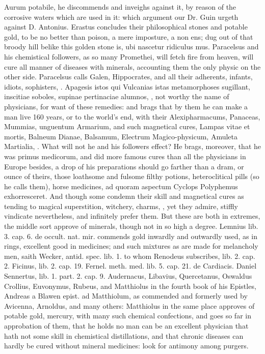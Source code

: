 {Aurum potabile, he discommends and inveighs against it, by reason
of the corrosive waters which are used in it: which argument our Dr.
Guin urgeth against D. Antonius. Erastus concludes their
philosophical stones and potable gold, \etc{} to be no better than poison,
a mere imposture, a non ens; dug out of that broody hill belike this
golden stone is, ubi nascetur ridiculus mus. Paracelsus and his
chemistical followers, as so many Promethei, will fetch fire from
heaven, will cure all manner of diseases with minerals, accounting them
the only physic on the other side. Paracelsus calls Galen,
Hippocrates, and all their adherents, infants, idiots, sophisters, \etc{}.
Apagesis istos qui Vulcanias istas metamorphoses sugillant, inscitiae
soboles, supinae pertinaciae alumnos, \etc{}, not worthy the name of
physicians, for want of these remedies: and brags that by them he can
make a man live 160 years, or to the world's end, with their
Alexipharmacums, Panaceas, Mummias, unguentum Armarium, and such
magnetical cures, Lampas vitae et mortis, Balneum Dianae, Balsamum,
Electrum Magico-physicum, Amuleta Martialia, \etc{}. What will not he and
his followers effect? He brags, moreover, that he was primus medicorum,
and did more famous cures than all the physicians in Europe besides,
a drop of his preparations should go farther than a dram, or
ounce of theirs, those loathsome and fulsome filthy potions,
heteroclitical pills (so he calls them), horse medicines, ad quoram
aspectum Cyclops Polyphemus exhorresceret. And though some condemn
their skill and magnetical cures as tending to magical superstition,
witchery, charms, \etc{}, yet they admire, stiffly vindicate nevertheless,
and infinitely prefer them. But these are both in extremes, the middle
sort approve of minerals, though not in so high a degree. Lemnius lib.
3. cap. 6. de occult. nat. mir. commends gold inwardly and outwardly
used, as in rings, excellent good in medicines; and such mixtures as
are made for melancholy men, saith Wecker, antid. spec. lib. 1. to whom
Renodeus subscribes, lib. 2. cap. 2. Ficinus, lib. 2. cap. 19. Fernel.
meth. med. lib. 5. cap. 21. de Cardiacis. Daniel Sennertus, lib. 1.
part. 2. cap. 9. Audernacus, Libavius, Quercetanus, Oswaldus Crollius,
Euvonymus, Rubeus, and Matthiolus in the fourth book of his Epistles,
Andreas a Blawen epist. ad Matthiolum, as commended and formerly used
by Avicenna, Arnoldus, and many others: Matthiolus in the same
place approves of potable gold, mercury, with many such chemical
confections, and goes so far in approbation of them, that he holds
 no man can be an excellent physician that hath not some skill in
chemistical distillations, and that chronic diseases can hardly be
cured without mineral medicines: look for antimony among purgers.

}
